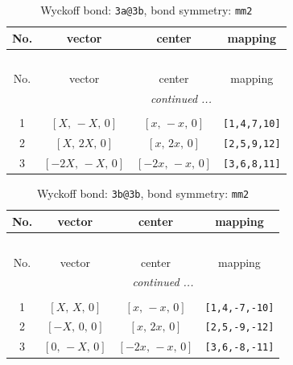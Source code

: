 \documentclass[fleqn,8pt]{jsarticle}
\begin{document}
\begin{longtable}{cccc}
\caption{Wyckoff bond: {\tt 3a@3b}, bond symmetry: {\tt mm2}}
 \\
 \hline \hline
No. & vector & center & mapping \\ \hline \endfirsthead

\multicolumn{3}{l}{\tablename\ \thetable{}} \\
 \hline \hline
No. & vector & center & mapping \\ \hline \endhead

 \hline \hline
\multicolumn{3}{r}{\footnotesize\it continued ...} \\ \endfoot

 \hline \hline
\multicolumn{3}{r}{} \\ \endlastfoot

1 & $\left[ X,\, - X,\, 0 \right]$ & $\left[ x,\, - x,\, 0 \right]$ & {\tt [1,4,7,10]} \\ \hline
2 & $\left[ X,\, 2 X,\, 0 \right]$ & $\left[ x,\, 2 x,\, 0 \right]$ & {\tt [2,5,9,12]} \\ \hline
3 & $\left[ - 2 X,\, - X,\, 0 \right]$ & $\left[ - 2 x,\, - x,\, 0 \right]$ & {\tt [3,6,8,11]} \\
\end{longtable}
\renewcommand{\arraystretch}{1.2}
\begin{longtable}{cccc}
\caption{Wyckoff bond: {\tt 3b@3b}, bond symmetry: {\tt mm2}}
 \\
 \hline \hline
No. & vector & center & mapping \\ \hline \endfirsthead

\multicolumn{3}{l}{\tablename\ \thetable{}} \\
 \hline \hline
No. & vector & center & mapping \\ \hline \endhead

 \hline \hline
\multicolumn{3}{r}{\footnotesize\it continued ...} \\ \endfoot

 \hline \hline
\multicolumn{3}{r}{} \\ \endlastfoot

1 & $\left[ X,\, X,\, 0 \right]$ & $\left[ x,\, - x,\, 0 \right]$ & {\tt [1,4,-7,-10]} \\ \hline
2 & $\left[ - X,\, 0,\, 0 \right]$ & $\left[ x,\, 2 x,\, 0 \right]$ & {\tt [2,5,-9,-12]} \\ \hline
3 & $\left[ 0,\, - X,\, 0 \right]$ & $\left[ - 2 x,\, - x,\, 0 \right]$ & {\tt [3,6,-8,-11]} \\
\end{longtable}
\end{document}
